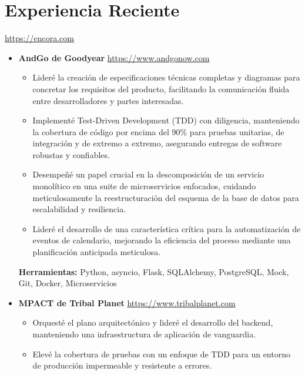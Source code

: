 \documentclass[11pt,a4paper,english]{moderncv}
\begin{document}
\maketitle

\section{Experiencia Reciente}

{
    \url{https://encora.com}
\newline{}
\begin{itemize}
    \item \textbf{AndGo de Goodyear}
        \newline{}
        \url{https://www.andgonow.com}
        \begin{itemize}
            \item Lideré la creación de especificaciones técnicas completas y diagramas para concretar los requisitos del producto, facilitando la comunicación fluida entre desarrolladores y partes interesadas.
            \item Implementé Test-Driven Development (TDD) con diligencia, manteniendo la cobertura de código por encima del 90\% para pruebas unitarias, de integración y de extremo a extremo, asegurando entregas de software robustas y confiables.
            \item Desempeñé un papel crucial en la descomposición de un servicio monolítico en una suite de microservicios enfocados, cuidando meticulosamente la reestructuración del esquema de la base de datos para escalabilidad y resiliencia.
            \item Lideré el desarrollo de una característica crítica para la automatización de eventos de calendario, mejorando la eficiencia del proceso mediante una planificación anticipada meticulosa.
        \end{itemize}
        \textbf{Herramientas:} Python, asyncio, Flask, SQLAlchemy, PostgreSQL, Mock, Git, Docker, Microservicios
    \item \textbf{MPACT de Tribal Planet}
        \newline{}
        \url{https://www.tribalplanet.com}
        \begin{itemize}
            \item Orquesté el plano arquitectónico y lideré el desarrollo del backend, manteniendo una infraestructura de aplicación de vanguardia.
            \item Elevé la cobertura de pruebas con un enfoque de TDD para un entorno de producción impermeable y resistente a errores.

\end{itemize}
\end{itemize}}
\end{document}
